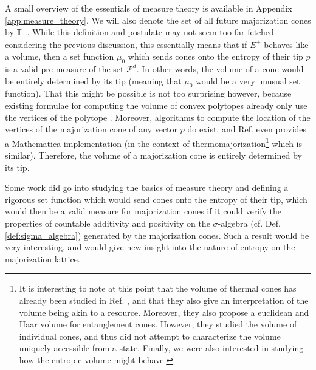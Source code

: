A small overview of the essentials of measure theory is available in Appendix \ref{app:measure_theory}. We will also denote the set of all future majorization cones by $\mathbb{T}_+$. While this definition and postulate may not seem too far-fetched considering the previous discussion, this essentially means that if $E^+$ behaves like a volume, then a set function $\mu_0$ which sends cones onto the entropy of their tip $p$ is a valid pre-measure of the set $\mathcal{P}^d$. In other words, the volume of a cone would be entirely determined by its tip (meaning that $\mu_0$ would be a very unusual set function). That this might be possible is not too surprising however, because existing formulae for computing the volume of convex polytopes already only use the vertices of the polytope \cite{braden_surveyors_1986}. Moreover, algorithms to compute the location of the vertices of the majorization cone of any vector $p$ do exist, and Ref. \cite{junior_thermalcones_2022} even provides a Mathematica implementation (in the context of thermomajorization\footnote{It is interesting to note at this point that the volume of thermal cones has already been studied in Ref. \cite{junior_geometric_2022}, and that they also give an interpretation of the volume being akin to a resource. Moreover, they also propose a euclidean and Haar volume for entanglement cones. However, they studied the volume of individual cones, and thus did not attempt to characterize the volume uniquely accessible from a state. Finally, we were also interested in studying how the entropic volume might behave.} which is similar). Therefore, the volume of a majorization cone is entirely determined by its tip.

Some work did go into studying the basics of measure theory and defining a rigorous set function which would send cones onto the entropy of their tip, which would then be a valid measure for majorization cones if it could verify the properties of countable additivity and positivity on the $\sigma$-algebra (cf. Def. \ref{def:sigma_algebra}) generated by the majorization cones. Such a result would be very interesting, and would give new insight into the nature of entropy on the majorization lattice.


